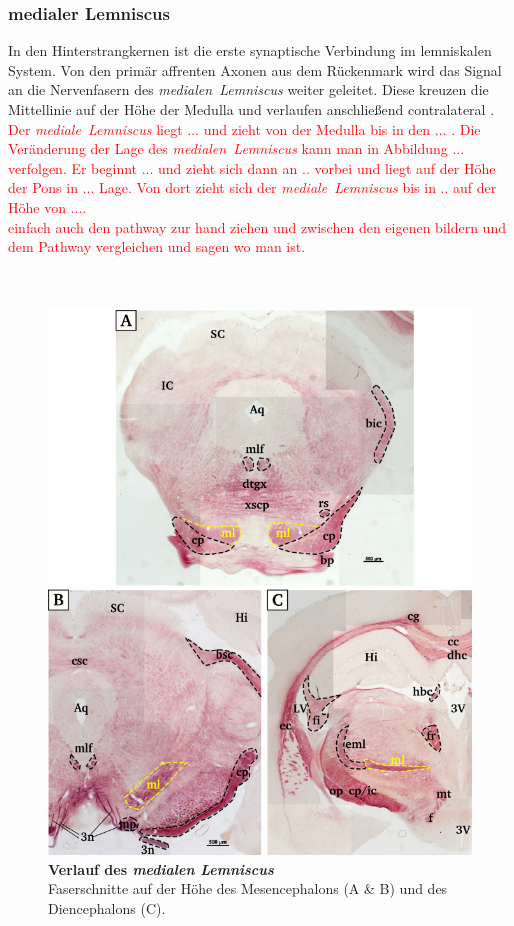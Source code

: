 \documentclass[12pt,a4paper,pdftex]{article}
\begin{document}
\subsubsection*{medialer Lemniscus}
In den Hinterstrangkernen ist die erste synaptische Verbindung im lemniskalen System. Von den primär affrenten Axonen aus dem Rückenmark wird das Signal an die Nervenfasern des \textit{medialen~Lemniscus} weiter geleitet. Diese kreuzen die Mittellinie auf der Höhe der Medulla und verlaufen anschließend contralateral \cite[Kap.~22]{kandel2013principles}. 
\textcolor{red}{Der \textit{mediale~Lemniscus} liegt ... und zieht von der Medulla bis in den ... . Die Veränderung der Lage des \textit{medialen~Lemniscus} kann man in Abbildung ... verfolgen. Er beginnt ... und zieht sich dann an .. vorbei und liegt auf der Höhe der Pons in ... Lage. Von dort zieht sich der \textit{mediale~Lemniscus} bis in .. auf der Höhe von .... \\ einfach auch den pathway zur hand ziehen und zwischen den eigenen bildern und dem Pathway vergleichen und sagen wo man ist.}
\\
\\
\\
\begin{figure}[H]
    \centering
    \includegraphics[width = \textwidth] {pictures/somatosensory/medial_lemniscus.png}
    \caption[Verlauf des \textit{medialen Lemniscus}]{\textbf{Verlauf des \textit{medialen Lemniscus}}\\
    Faserschnitte auf der Höhe des Mesencephalons (A \& B) und des Diencephalons (C).}
    \label{fig:medialer_lemniscus}
\end{figure}
\end{document}
